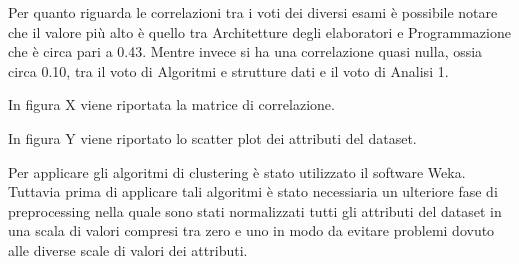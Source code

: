 \documentclass[12pt]{article}
\begin{document}
Per quanto riguarda le correlazioni tra i voti dei diversi esami è possibile notare che il valore più alto è quello tra Architetture degli elaboratori e Programmazione che è circa pari a 0.43.
Mentre invece si ha una correlazione quasi nulla, ossia circa 0.10, tra il voto di Algoritmi e strutture dati e il voto di Analisi 1.

In figura X viene riportata la matrice di correlazione.

In figura Y viene riportato lo scatter plot dei attributi del dataset.

Per applicare gli algoritmi di clustering è stato utilizzato il software Weka. Tuttavia prima di applicare tali algoritmi è stato necessiaria un ulteriore fase di preprocessing
nella quale sono stati normalizzati tutti gli attributi del dataset in una scala di valori compresi tra zero e uno in modo da evitare problemi dovuto alle diverse scale di valori dei attributi.
\end{document}
